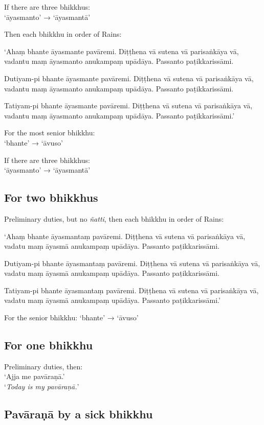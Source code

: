 If there are three bhikkhus:\\
‘āyasmanto’ → ‘āyasmantā’

Then each bhikkhu in order of Rains:

‘Ahaṃ bhante āyasmante pavāremi. Diṭṭhena vā sutena vā parisaṅkāya vā, vadantu
maṃ āyasmanto anukampaṃ upādāya. Passanto paṭikkarissāmi.

Dutiyam-pi bhante āyasmante pavāremi. Diṭṭhena vā sutena vā parisaṅkāya vā,
vadantu maṃ āyasmanto anukampaṃ upādāya. Passanto paṭikkarissāmi.

Tatiyam-pi bhante āyasmante pavāremi. Diṭṭhena vā sutena vā parisaṅkāya vā,
vadantu maṃ āyasmanto anukampaṃ upādāya. Passanto paṭikkarissāmi.’

For the most senior bhikkhu:\\
‘bhante’ → ‘āvuso’

If there are three bhikkhus:\\
‘āyasmanto’ → ‘āyasmantā’

\subsection{For two bhikkhus}

Preliminary duties, but no \emph{ñatti}, then each bhikkhu in order of Rains:

‘Ahaṃ bhante āyasmantaṃ pavāremi. Diṭṭhena vā sutena vā parisaṅkāya vā, vadatu
maṃ āyasmā anukampaṃ upādāya. Passanto paṭikkarissāmi.

Dutiyam-pi bhante āyasmantaṃ pavāremi. Diṭṭhena vā sutena vā parisaṅkāya vā,
vadatu maṃ āyasmā anukampaṃ upādāya. Passanto paṭikkarissāmi.

Tatiyam-pi bhante āyasmantaṃ pavāremi. Diṭṭhena vā sutena vā parisaṅkāya vā,
vadatu maṃ āyasmā anukampaṃ upādāya. Passanto paṭikkarissāmi.’

For the senior bhikkhu: ‘bhante’ → ‘āvuso’


\subsection{For one bhikkhu}

Preliminary duties, then:\\
‘Ajja me pavāraṇā.’\\
‘\emph{Today is my pavāraṇā.}’ 

\subsection{Pavāraṇā by a sick bhikkhu}

